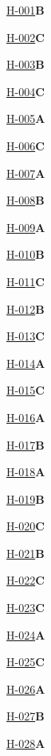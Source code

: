 \noindent\hyperref[q:H-001]{H-001}\hfill\textbf{B}\par
\noindent\hyperref[q:H-002]{H-002}\hfill\textbf{C}\par
\noindent\hyperref[q:H-003]{H-003}\hfill\textbf{B}\par
\noindent\hyperref[q:H-004]{H-004}\hfill\textbf{C}\par
\noindent\hyperref[q:H-005]{H-005}\hfill\textbf{A}\par
\noindent\hyperref[q:H-006]{H-006}\hfill\textbf{C}\par
\noindent\hyperref[q:H-007]{H-007}\hfill\textbf{A}\par
\noindent\hyperref[q:H-008]{H-008}\hfill\textbf{B}\par
\noindent\hyperref[q:H-009]{H-009}\hfill\textbf{A}\par
\noindent\hyperref[q:H-010]{H-010}\hfill\textbf{B}\par
\noindent\hyperref[q:H-011]{H-011}\hfill\textbf{C}\par
\noindent\hyperref[q:H-012]{H-012}\hfill\textbf{B}\par
\noindent\hyperref[q:H-013]{H-013}\hfill\textbf{C}\par
\noindent\hyperref[q:H-014]{H-014}\hfill\textbf{A}\par
\noindent\hyperref[q:H-015]{H-015}\hfill\textbf{C}\par
\noindent\hyperref[q:H-016]{H-016}\hfill\textbf{A}\par
\noindent\hyperref[q:H-017]{H-017}\hfill\textbf{B}\par
\noindent\hyperref[q:H-018]{H-018}\hfill\textbf{A}\par
\noindent\hyperref[q:H-019]{H-019}\hfill\textbf{B}\par
\noindent\hyperref[q:H-020]{H-020}\hfill\textbf{C}\par
\noindent\hyperref[q:H-021]{H-021}\hfill\textbf{B}\par
\noindent\hyperref[q:H-022]{H-022}\hfill\textbf{C}\par
\noindent\hyperref[q:H-023]{H-023}\hfill\textbf{C}\par
\noindent\hyperref[q:H-024]{H-024}\hfill\textbf{A}\par
\noindent\hyperref[q:H-025]{H-025}\hfill\textbf{C}\par
\noindent\hyperref[q:H-026]{H-026}\hfill\textbf{A}\par
\noindent\hyperref[q:H-027]{H-027}\hfill\textbf{B}\par
\noindent\hyperref[q:H-028]{H-028}\hfill\textbf{A}\par
